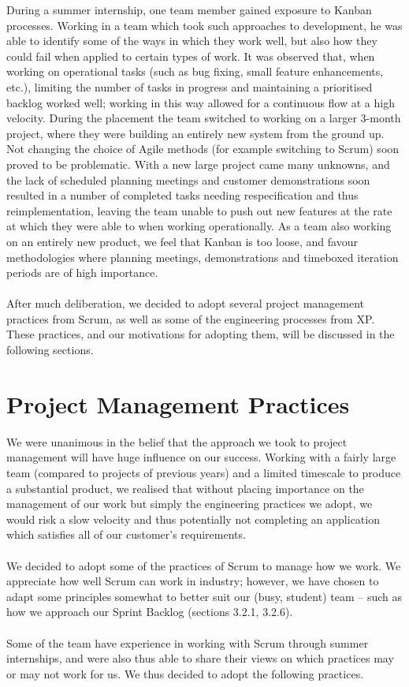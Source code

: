 \documentclass[a4paper, 10pt]{report}
\begin{document}
During a summer internship, one team member gained exposure to Kanban processes. Working in a team which took such approaches to development, he was able to identify some of the ways in which they work well, but also how they could fail when applied to certain types of work. It was observed that, when working on operational tasks (such as bug fixing, small feature enhancements, etc.), limiting the number of tasks in progress and maintaining a prioritised backlog worked well; working in this way allowed for a continuous flow at a high velocity. During the placement the team switched to working on a larger 3-month project, where they were building an entirely new system from the ground up. Not changing the choice of Agile methods (for example switching to Scrum) soon proved to be problematic. With a new large project came many unknowns, and the lack of scheduled planning meetings and customer demonstrations soon resulted in a number of completed tasks needing respecification and thus reimplementation, leaving the team unable to push out new features at the rate at which they were able to when working operationally. As a team also working on an entirely new product, we feel that Kanban is too loose, and favour methodologies where planning meetings, demonstrations and timeboxed iteration periods are of high importance.\\\\
After much deliberation, we decided to adopt several project management practices from Scrum, as well as some of the engineering processes from XP. These practices, and our motivations for adopting them, will be discussed in the following sections.
\section{Project Management Practices}
We were unanimous in the belief that the approach we took to project management will have huge influence on our success. Working with a fairly large team (compared to projects of previous years) and a limited timescale to produce a  substantial product, we realised that without placing importance on the management of our work but simply the engineering practices we adopt, we would risk a slow velocity and thus potentially not completing an application which satisfies all of our customer's requirements.\\\\
We decided to adopt some of the practices of Scrum to manage how we work. We appreciate how well Scrum can work in industry; however, we have chosen to adapt some principles somewhat to better suit our (busy, student) team -- such as how we approach our Sprint Backlog (sections 3.2.1, 3.2.6).\\\\
Some of the team have experience in working with Scrum through summer internships, and were also thus able to share their views on which practices may or may not work for us. We thus decided to adopt the following practices.
\end{document}
